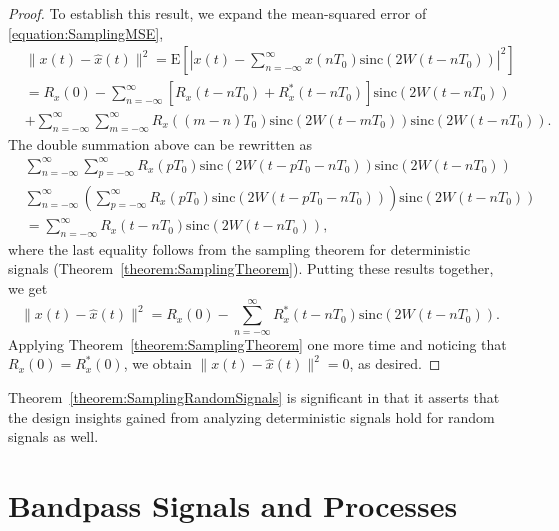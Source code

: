 \begin{proof}
To establish this result, we expand the mean-squared error of \eqref{equation:SamplingMSE},
\begin{equation*}
\begin{split}
&\| x(t) - \hat{x}(t) \|^2
= \mathrm{E} \left[ \left| x(t) - \sum_{n=-\infty}^{\infty} x(nT_0)
\mathrm{sinc}(2 W (t - nT_0)) \right|^2 \right] \\
&= R_x(0) - \sum_{n=-\infty}^{\infty} [ R_x(t-nT_0) + R_x^*(t-nT_0) ]
\mathrm{sinc}(2 W (t - nT_0)) \\
&+ \sum_{n=-\infty}^{\infty} \sum_{m=-\infty}^{\infty} R_x((m-n)T_0)
\mathrm{sinc}(2 W (t - mT_0)) \mathrm{sinc}(2 W (t - nT_0)) .
\end{split}
\end{equation*}
The double summation above can be rewritten as
\begin{equation*}
\begin{split}
&\sum_{n=-\infty}^{\infty} \sum_{p=-\infty}^{\infty} R_x(pT_0)
\mathrm{sinc}(2 W (t - pT_0 - nT_0)) \mathrm{sinc}(2 W (t - nT_0)) \\
&\sum_{n=-\infty}^{\infty} \left( \sum_{p=-\infty}^{\infty} R_x(pT_0)
\mathrm{sinc}(2 W (t - pT_0 - nT_0)) \right) \mathrm{sinc}(2 W (t - nT_0)) \\
&= \sum_{n=-\infty}^{\infty} R_x(t - nT_0) \mathrm{sinc}(2 W (t - nT_0)) ,
\end{split}
\end{equation*}
where the last equality follows from the sampling theorem for deterministic signals (Theorem~\ref{theorem:SamplingTheorem}).
Putting these results together, we get
\begin{equation*}
\| x(t) - \hat{x}(t) \|^2
= R_x(0) - \sum_{n=-\infty}^{\infty} R_x^*(t-nT_0) \mathrm{sinc}(2 W (t - nT_0)) .
\end{equation*}
Applying Theorem~\ref{theorem:SamplingTheorem} one more time and noticing that $R_x(0) = R_x^*(0)$, we obtain $\| x(t) - \hat{x}(t) \|^2 = 0$, as desired.
\end{proof}

Theorem~\ref{theorem:SamplingRandomSignals} is significant in that it asserts that the design insights gained from analyzing deterministic signals hold for random signals as well.


\section{Bandpass Signals and Processes}


